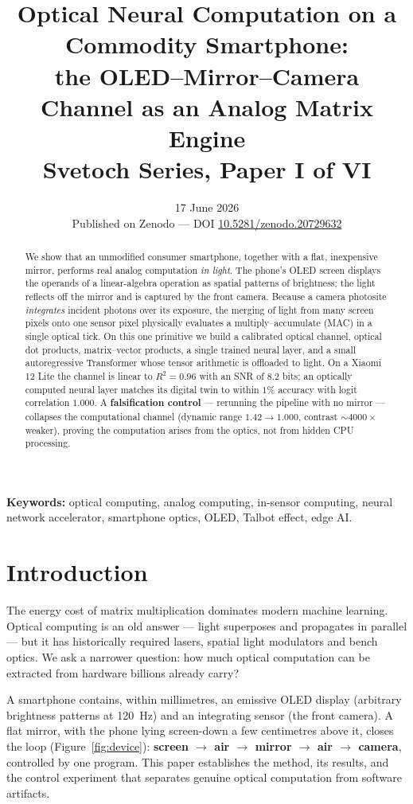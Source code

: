 \documentclass[11pt]{article}
\title{\textbf{Optical Neural Computation on a Commodity Smartphone:\\
the OLED--Mirror--Camera Channel as an Analog Matrix Engine}\\[4pt]
{\large Svetoch Series, Paper I of VI}}
\author{\svetochauthor}
\date{17 June 2026\\[2pt]{\normalsize Published on Zenodo --- DOI \href{https://doi.org/10.5281/zenodo.20729632}{10.5281/zenodo.20729632}}}
\begin{document}
\maketitle

\begin{abstract}
\noindent We show that an unmodified consumer smartphone, together with a flat, inexpensive mirror,
performs real analog computation \emph{in light}. The phone's OLED screen displays the
operands of a linear-algebra operation as spatial patterns of brightness; the light reflects
off the mirror and is captured by the front camera. Because a camera photosite
\emph{integrates} incident photons over its exposure, the merging of light from many screen
pixels onto one sensor pixel physically evaluates a multiply--accumulate (MAC) in a single
optical tick. On this one primitive we build a calibrated optical channel, optical dot
products, matrix--vector products, a single trained neural layer, and a small autoregressive
Transformer whose tensor arithmetic is offloaded to light. On a Xiaomi 12 Lite the channel is
linear to $R^2 = 0.96$ with an SNR of $8.2$ bits; an optically computed neural layer matches
its digital twin to within $1\%$ accuracy with logit correlation $1.000$. A
\textbf{falsification control} --- rerunning the pipeline with no mirror --- collapses the
computational channel (dynamic range $1.42 \to 1.000$, contrast $\sim\!4000\times$ weaker),
proving the computation arises from the optics, not from hidden CPU processing.
\end{abstract}

\noindent\textbf{Keywords:} optical computing, analog computing, in-sensor computing, neural
network accelerator, smartphone optics, OLED, Talbot effect, edge AI.

\section{Introduction}
The energy cost of matrix multiplication dominates modern machine learning. Optical computing
is an old answer --- light superposes and propagates in parallel --- but it has historically
required lasers, spatial light modulators and bench optics. We ask a narrower question: how
much optical computation can be extracted from hardware billions already carry?

A smartphone contains, within millimetres, an emissive OLED display (arbitrary brightness
patterns at \SI{120}{\hertz}) and an integrating sensor (the front camera). A flat mirror,
with the phone lying screen-down a few centimetres above it, closes the loop
(Figure~\ref{fig:device}): \textbf{screen $\to$ air $\to$ mirror $\to$ air $\to$ camera},
controlled by one program. This paper establishes the method, its results, and the control
experiment that separates genuine optical computation from software artifacts.
\end{document}
